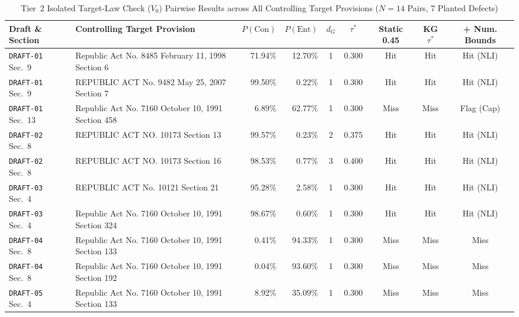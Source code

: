 \begin{landscape}
\begin{table}[p]
    \centering
    \scriptsize
    \setlength{\tabcolsep}{3.0pt}
    \renewcommand{\arraystretch}{0.88}
    \caption[Tier 2 Isolated Target-Law Pair Breakdown ($V_0$)]{Tier~2 Isolated Target-Law Check ($V_0$) Pairwise Results across All Controlling Target Provisions ($N = 14$ Pairs, 7 Planted Defects)}
    \label{tab:app_tier2_v0_pairs}
    \begin{tabularx}{\linewidth}{@{} >{\RaggedRight\arraybackslash}p{2.9cm} >{\RaggedRight\arraybackslash}X r r c c c c c @{}}
        \toprule
        \textbf{Draft \& Section} & \textbf{Controlling Target Provision} & \textbf{$P(\text{Con})$} & \textbf{$P(\text{Ent})$} & \textbf{$d_G$} & \textbf{$\tau^*$} & \textbf{Static 0.45} & \textbf{KG $\tau^*$} & \textbf{+ Num. Bounds} \\
        \midrule
        \texttt{DRAFT-01} Sec.~9 & Republic Act No. 8485 February 11, 1998 Section 6 & 71.94\% & 12.70\% & 1 & 0.300 & Hit & Hit & Hit (NLI) \\
        \texttt{DRAFT-01} Sec.~9 & REPUBLIC ACT No. 9482 May 25, 2007 Section 7 & 99.50\% & 0.22\% & 1 & 0.300 & Hit & Hit & Hit (NLI) \\
        \texttt{DRAFT-01} Sec.~13 & Republic Act No. 7160 October 10, 1991 Section 458 & 6.89\% & 62.77\% & 1 & 0.300 & Miss & Miss & Flag (Cap) \\
        \texttt{DRAFT-02} Sec.~8 & REPUBLIC ACT NO. 10173 Section 13 & 99.57\% & 0.23\% & 2 & 0.375 & Hit & Hit & Hit (NLI) \\
        \texttt{DRAFT-02} Sec.~8 & REPUBLIC ACT NO. 10173 Section 16 & 98.53\% & 0.77\% & 3 & 0.400 & Hit & Hit & Hit (NLI) \\
        \texttt{DRAFT-03} Sec.~4 & REPUBLIC ACT No. 10121 Section 21 & 95.28\% & 2.58\% & 1 & 0.300 & Hit & Hit & Hit (NLI) \\
        \texttt{DRAFT-03} Sec.~4 & Republic Act No. 7160 October 10, 1991 Section 324 & 98.67\% & 0.60\% & 1 & 0.300 & Hit & Hit & Hit (NLI) \\
        \texttt{DRAFT-04} Sec.~8 & Republic Act No. 7160 October 10, 1991 Section 133 & 0.41\% & 94.33\% & 1 & 0.300 & Miss & Miss & Miss \\
        \texttt{DRAFT-04} Sec.~8 & Republic Act No. 7160 October 10, 1991 Section 192 & 0.04\% & 93.60\% & 1 & 0.300 & Miss & Miss & Miss \\
        \texttt{DRAFT-05} Sec.~4 & Republic Act No. 7160 October 10, 1991 Section 133 & 8.92\% & 35.09\% & 1 & 0.300 & Miss & Miss & Miss \\

\end{tabularx}
\end{table}
\end{landscape}
